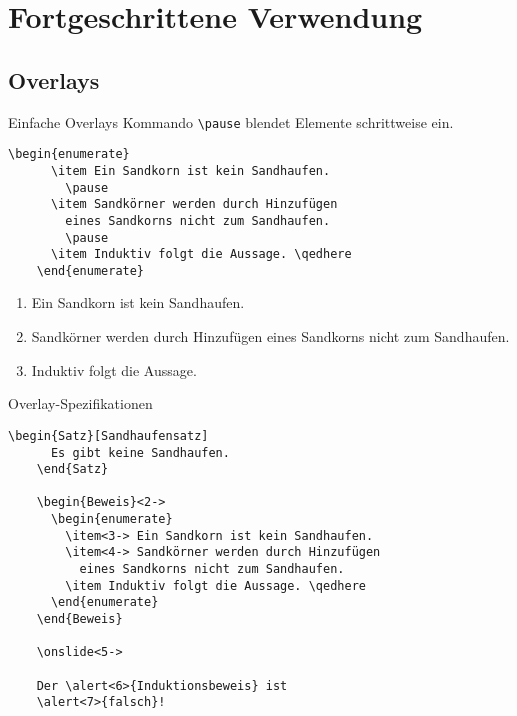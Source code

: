 \section{Fortgeschrittene Verwendung}

\subsection{Overlays}

\begin{Frame}[fragile]{Einfache Overlays}
  Kommando \lstinline-\pause- blendet Elemente schrittweise ein.

  \begin{lstlisting}[gobble=4]
    \begin{enumerate}
      \item Ein Sandkorn ist kein Sandhaufen.
        \pause
      \item Sandkörner werden durch Hinzufügen
        eines Sandkorns nicht zum Sandhaufen.
        \pause
      \item Induktiv folgt die Aussage. \qedhere
    \end{enumerate}
  \end{lstlisting}

  \xxx
  
  \begin{enumerate}
    \item Ein Sandkorn ist kein Sandhaufen.
      \pause
    \item Sandkörner werden durch Hinzufügen
      eines Sandkorns nicht zum Sandhaufen.
      \pause
    \item Induktiv folgt die Aussage. \qedhere
  \end{enumerate}
\end{Frame}

\begin{Frame}[fragile]{Overlay-Spezifikationen}
  \begin{lstlisting}[gobble=4]
    \begin{Satz}[Sandhaufensatz]
      Es gibt keine Sandhaufen.
    \end{Satz}

    \begin{Beweis}<2->
      \begin{enumerate}
        \item<3-> Ein Sandkorn ist kein Sandhaufen.
        \item<4-> Sandkörner werden durch Hinzufügen
          eines Sandkorns nicht zum Sandhaufen.
        \item Induktiv folgt die Aussage. \qedhere
      \end{enumerate}
    \end{Beweis}

    \onslide<5->

    Der \alert<6>{Induktionsbeweis} ist
    \alert<7>{falsch}!
  \end{lstlisting}
\end{Frame}


